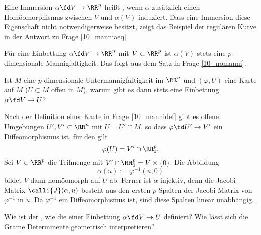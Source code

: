 \begin{antwort}
  Eine Immersion $\alpha\fd V\to\RR^n$ heißt , 
  wenn $\alpha$ zusätzlich einen Homöomorphismus 
  zwischen $V$ und $\alpha(V)$ induziert. Dass eine Immersion diese 
  Eigenschaft nicht notwendigerweise besitzt, zeigt das Beispiel der 
  regulären Kurve in der Antwort zu Frage \ref{10_manniaeq}. 

  Für eine Einbettung $\alpha \fd V\to\RR^n$ mit $V\subset\RR^p$ 
  ist $\alpha(V)$ stets eine $p$-dimensionale Mannigfaltigkeit. Das folgt 
  aus dem Satz in Frage \ref{10_nomanni}. 
  \AntEnd
\end{antwort} 

\begin{frage}
  Ist $M$ eine $p$-dimensionale Untermannigfaltigkeit im $\RR^n$ und 
  $(\varphi,U)$ eine Karte auf $M$ ($U\subset M$ offen in $M$), warum gibt es 
  dann stets eine Einbettung $\alpha\fd V\to U$?
\end{frage}

\begin{antwort}
  Nach der Definition einer Karte in Frage \ref{10_mannidef} 
  gibt es offene Umgebungen $U', V'\subset \RR^n$ mit 
  $U=U'\cap M$, so dass $\varphi \fd U'\to V'$ ein Diffeomorphismus 
  ist, für den gilt
  \[
  \varphi(U)=V' \cap \RR_0^p.  
  \]
  Sei $V\subset \RR^p$ die Teilmenge mit $V'\cap\RR_0^p=V\times\{0\}$. 
  Die Abbildung 
  \[
  \alpha( u ) := \varphi^{-1}(u,0)
  \]
  bildet $V$ dann homöomorph auf $U$ ab. Ferner ist $\alpha$ injektiv, 
  denn die Jacobi-Matrix $\calli{J}(\alpha,u)$ besteht aus den 
  ersten $p$ Spalten der Jacobi-Matrix von $\varphi^{-1}$ in $u$. 
  Da $\varphi^{-1}$ ein Diffeomorphismus ist, sind diese Spalten 
  linear unabhängig. 
  \AntEnd
\end{antwort}

\begin{frage}
  Wie ist der , 
  wie die  
  einer Einbettung $\alpha \fd V\to U$ definiert?  
  Wie lässt sich die Gram\sch e Determinente geometrisch interpretieren?
\end{frage}



